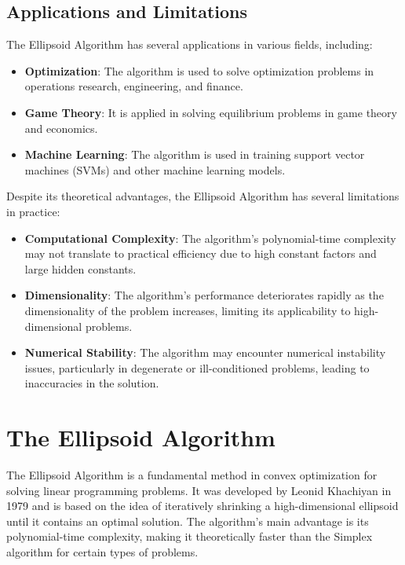 \documentclass[12pt]{book} %
\begin{document}
\subsection{Applications and Limitations}

The Ellipsoid Algorithm has several applications in various fields, including:

\begin{itemize}
    \item \textbf{Optimization}: The algorithm is used to solve optimization problems in operations research, engineering, and finance.
    
    \item \textbf{Game Theory}: It is applied in solving equilibrium problems in game theory and economics.
    
    \item \textbf{Machine Learning}: The algorithm is used in training support vector machines (SVMs) and other machine learning models.
\end{itemize}


Despite its theoretical advantages, the Ellipsoid Algorithm has several limitations in practice:

\begin{itemize}
    \item \textbf{Computational Complexity}: The algorithm's polynomial-time complexity may not translate to practical efficiency due to high constant factors and large hidden constants.
    
    \item \textbf{Dimensionality}: The algorithm's performance deteriorates rapidly as the dimensionality of the problem increases, limiting its applicability to high-dimensional problems.
    
    \item \textbf{Numerical Stability}: The algorithm may encounter numerical instability issues, particularly in degenerate or ill-conditioned problems, leading to inaccuracies in the solution.
\end{itemize}

\section{The Ellipsoid Algorithm}
The Ellipsoid Algorithm is a fundamental method in convex optimization for solving linear programming problems. It was developed by Leonid Khachiyan in 1979 and is based on the idea of iteratively shrinking a high-dimensional ellipsoid until it contains an optimal solution. The algorithm's main advantage is its polynomial-time complexity, making it theoretically faster than the Simplex algorithm for certain types of problems.
\end{document}
